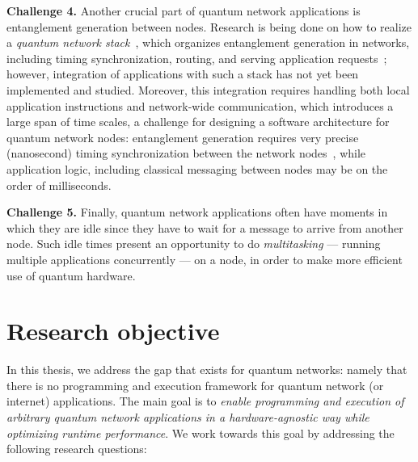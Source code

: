 \textbf{Challenge 4.} Another crucial part of quantum network applications is entanglement generation between nodes.
Research is being done on how to realize a \emph{quantum network stack}~\cite{dahlberg2019linklayer,kozlowski2020networklayer, caleffi_2017_optimal}, which organizes entanglement generation in networks, including timing synchronization, routing, and serving application requests~\cite{gauthier_control_2023};
however, integration of applications with such a stack has not yet been implemented and studied.
Moreover, this integration requires handling both local application instructions and network-wide communication, which introduces a large span of time scales, a challenge for designing a software architecture for quantum network nodes: entanglement generation requires very precise (nanosecond) timing synchronization between the network nodes~\cite{dahlberg2019link}, while application logic, including classical messaging between nodes may be on the order of milliseconds.

\textbf{Challenge 5.} Finally, quantum network applications often have moments in which they are idle since they have to wait for a message to arrive from another node.
Such idle times present an opportunity to do \emph{multitasking} --- running multiple applications concurrently --- on a node, in order to make more efficient use of quantum hardware.


\section{Research objective}
In this thesis, we address the gap that exists for quantum networks: namely that there is no programming and execution framework for quantum network (or internet) applications.
The main goal is to \emph{enable programming and execution of arbitrary quantum network applications in a hardware-agnostic way while optimizing runtime performance}.
We work towards this goal by addressing the following research questions:


